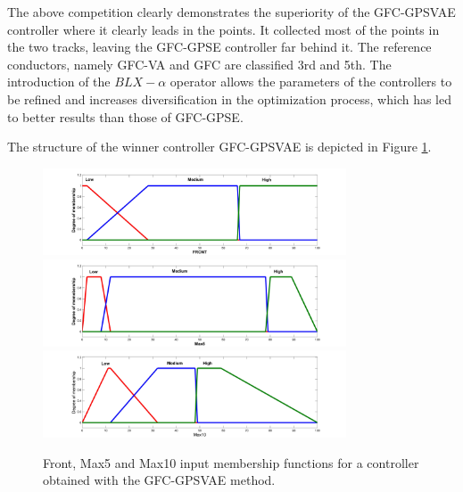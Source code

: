 \documentclass[10pt,journal,compsoc]{IEEEtran}
\begin{document}
The above competition clearly demonstrates the superiority of the {\sf GFC-GPSVAE} controller where it clearly leads in the points. It collected most of the points in the two tracks, leaving the {\sf GFC-GPSE} controller far behind it. The reference conductors, namely {\sf GFC-VA} and {\sf GFC}  are classified 3rd and 5th.
The introduction of the $BLX-\alpha$ operator allows the parameters of the controllers to be refined and  increases diversification in the optimization process, which has led to better results than those of {\sf GFC-GPSE}.

The structure of the winner controller {\sf GFC-GPSVAE} is depicted in Figure \ref{fig:frontmfs}. %
%
\begin{figure}[!ht]	
  \begin{center}
    \includegraphics[width=9cm]{fig/FRONT.jpg}
    \includegraphics[width=9cm]{fig/MAX5.jpg}
    \includegraphics[width=9cm]{fig/MAX10.jpg}		
    \caption{Front, Max5 and Max10 input membership functions for a controller obtained with the 
      {\sf GFC-GPSVAE} method.}
    \label{fig:frontmfs}
  \end{center}	
\end{figure}
\end{document}
